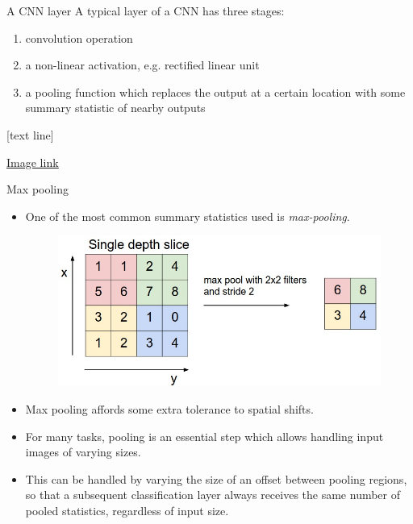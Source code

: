 \documentclass{beamer}
\newcommand{\referencefootnote}[1]{\setbeamertemplate{footline}[text line]{%
\parbox{0.9\paperwidth}{\vspace*{-23pt}\tiny{\textcolor{gray}{#1}}\hfill\scriptsize\insertframenumber}}}
\begin{document}
			\begin{frame}{A CNN layer}
	A typical layer of a CNN has three stages:
	\begin{enumerate}
	\item convolution operation %
	\item a non-linear activation, e.g. rectified linear unit %
	\item a pooling function which replaces the output at a certain location with some summary statistic of nearby outputs
	\end{enumerate}
	\end{frame}

{ \referencefootnote{\href{http://cs231n.github.io/assets/cnn/maxpool.jpeg}{\underline{Image link}}}
	\begin{frame}{Max pooling}
	\footnotesize
	\begin{itemize}
		\item One of the most common summary statistics used is \emph{max-pooling}.
	\begin{figure}
            \centering
            \includegraphics[width=0.6\linewidth]{figures/maxpool.jpeg}
        \end{figure}
	\item Max pooling affords some extra tolerance to spatial shifts.%
	\item For many tasks, pooling is an essential step which allows handling input images of varying sizes.  
	\item This can be handled by varying the size of an offset between pooling regions, so that a subsequent classification layer always receives the same number of pooled statistics, regardless of input size.
	\end{itemize}
	\end{frame}
	}
\end{document}
